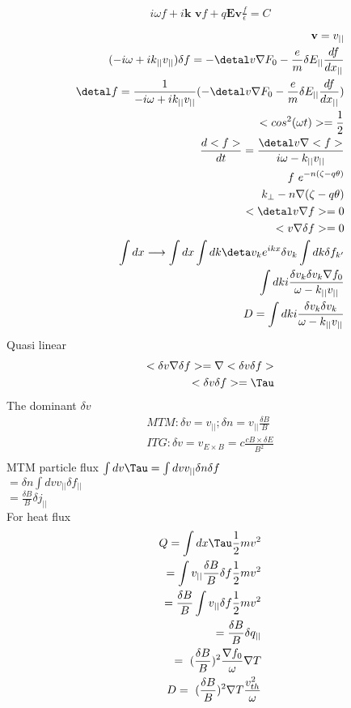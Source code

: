 \begin{eqnarray}
     i\omega f + i \textbf{k v} f + q \textbf{Ev} \frac{f}{\epsilon}=C
\end{eqnarray}
\begin{eqnarray}
     \textbf{v}=v_{||}\\
     (-i\omega +ik_{||}v_{||})\delta f=-\detal v \nabla F_0 -\frac{e}{m} \delta E_{||} \frac{df }{d x_{||}}\\
     \detal f =\frac{1}{-i\omega +ik_{||}v_{||}}(-\detal v \nabla F_0 -\frac{e}{m} \delta E_{||} \frac{df }{d x_{||}})\\
     <cos^2(\omega t)>=\frac{1}{2}\\
     \frac{d<f>}{dt}=\frac{\detal v \nabla <f>}{i\omega -k_{||}v_{||}}\\
     f~ e^{-n(\zeta -q \theta)}\\
     k_{\perp}-n\nabla(\zeta -q \theta)\\
     <\detal v \nabla f>=0\\
     <v \nabla \delta f>=0\\
     \int dx \longrightarrow \int dx \int dk \deta v_k e^{ikx}\delta v_k \int dk \delta f_{k'}\\
     \int dk i\frac{\delta v_k \delta v_k \nabla f_0}{\omega - k_{||}v_{||}}\\
     D=\int dk i\frac{\delta v_k \delta v_k }{\omega - k_{||}v_{||}}\\
\end{eqnarray}
Quasi linear\\
\begin{eqnarray}
     <\delta v \nabla \delta f>= \nabla <\delta v  \delta f>\\
     <\delta v  \delta f>=\Tau 
\end{eqnarray}
The dominant $\delta v$\\
\begin{eqnarray}
     MTM: \delta v=v_{||}; \delta n= v_{||}\frac{\delta B}{B}\\
     ITG: \delta v= v_{E\times B}=c\frac{c B \times \delta E}{B^2}\\
\end{eqnarray}
MTM particle flux
$\int dv \Tau = \int dv v_{||}\delta n \delta f$\\
$=\delta n \int dv v_{||}\delta f_{||}$\\
$=\frac{\delta B}{B} \delta j_{||}$\\
For heat flux
\begin{eqnarray}
     Q=\int dx \Tau \frac{1}{2} m v^2\\
     =\int v_{||}\frac{\delta B}{B} \delta f \frac{1}{2}mv^2\\
     =\frac{\delta B}{B}\int v_{||} \delta f \frac{1}{2}mv^2\\
     =\frac{\delta B}{B} \delta q_{||}\\
     =~(\frac{\delta B}{B})^2 \frac{\nabla f_0}{\omega}\nabla T\\
     D=~(\frac{\delta B}{B})^2 \nabla T\frac{v_{th}^2}{\omega}
\end{eqnarray}
